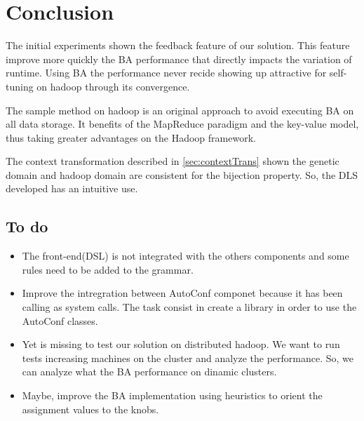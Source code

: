 \chapter{Conclusion} %
\label{cha:conclusion}

The initial experiments shown the feedback feature of our solution. This feature
improve more quickly the BA performance that directly impacts the variation of
runtime. Using BA the performance never recide showing up attractive for self-tuning
on hadoop through its convergence.

The sample method on hadoop is an original approach to avoid executing BA on all
data storage. It benefits of the MapReduce paradigm and the key-value model, thus
taking greater advantages on the Hadoop framework.

The context transformation described in \ref{sec:contextTrans} shown the genetic
domain and hadoop domain are consistent for the bijection property. So, the DLS
developed has an intuitive use.

\section{To do}

\begin{itemize}

    \item The front-end(DSL) is not integrated with the others components and some
    rules need to be added to the grammar.

    \item Improve the intregration between AutoConf componet because it has been
    calling as system calls. The task consist in create a library in order to use
    the AutoConf classes.

    \item Yet is missing to test our solution on distributed hadoop. We want to
    run tests increasing machines on the cluster and analyze the performance. So,
    we can analyze what the BA performance on dinamic clusters.

    \item Maybe, improve the BA implementation using heuristics to orient the
    assignment values to the knobs.

\end{itemize}
